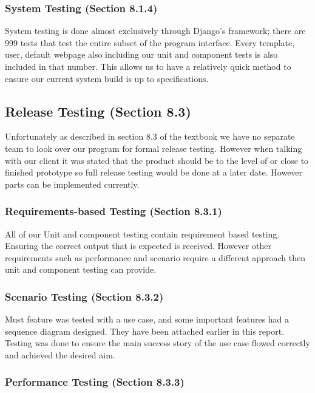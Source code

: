 \documentclass[11pt]{article}
\begin{document}
		\subsubsection{System Testing (Section 8.1.4)}

			System testing is done almost exclusively through Django's framework; there are 999 tests that test the entire subset of the program interface. 
			Every template, user, default webpage also including our unit and component tests is also included in that number. 
			This allows us to have a relatively quick method to ensure our current system build is up to specifications.

	\subsection{Release Testing (Section 8.3)}

		Unfortunately as described in section 8.3 of the textbook we have no separate team to look over our program for formal release testing.
		However when talking with our client it was stated that the product should be to the level of or close to finished prototype so full release testing would be done at a later date. 
		However parts can be implemented currently. 

		\subsubsection{Requirements-based Testing (Section 8.3.1)}

			All of our Unit and component testing contain requirement based testing. 
			Ensuring the correct output that is expected is received. 
			However other requirements such as performance and scenario require a different approach then unit and component testing can provide.

		\subsubsection{Scenario Testing (Section 8.3.2)}

			Must feature was tested with a use case, and some important features had a sequence diagram designed. 
			They have been attached earlier in this report. 
			Testing was done to ensure the main success story of the use case flowed correctly and achieved the desired aim.

		\subsubsection{Performance Testing (Section 8.3.3)}
\end{document}
